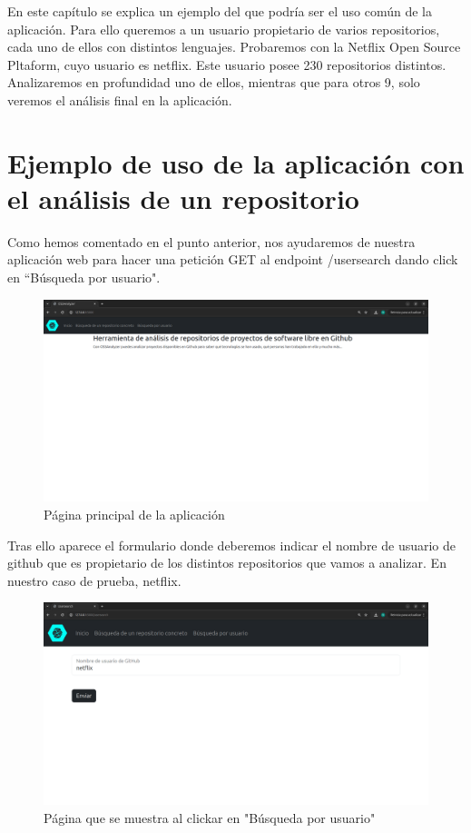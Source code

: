 \documentclass[a4paper, 12pt]{book}
\begin{document}
En este capítulo se explica un ejemplo del que podría ser el uso común de la aplicación. Para ello queremos a un usuario propietario de varios repositorios, cada uno de ellos con distintos lenguajes. Probaremos con la Netflix Open Source Pltaform, cuyo usuario es netflix. Este usuario posee 230 repositorios distintos. Analizaremos en profundidad uno de ellos, mientras que para otros 9, solo veremos el análisis final en la aplicación.

\section{Ejemplo de uso de la aplicación con el análisis de un repositorio}
\label{sec:Ejemplo de uso de la aplicación con el análisis de un repositorio}

Como hemos comentado en el punto anterior, nos ayudaremos de nuestra aplicación web para hacer una petición GET al endpoint /usersearch dando click en ``Búsqueda por usuario".

\begin{figure}[H]
  \centering
  \includegraphics[width=1\textwidth]{img/paginaprincipal.png}
  \caption{Página principal de la aplicación}
  \label{figura:mainpage2}
\end{figure}

Tras ello aparece el formulario donde deberemos indicar el nombre de usuario de github que es propietario de los distintos repositorios que vamos a analizar. En nuestro caso de prueba, netflix.

\begin{figure}[H]
  \centering
  \includegraphics[width=1\textwidth]{img/getusersearch.png}
  \caption{Página que se muestra al clickar en "Búsqueda por usuario"}
  \label{figura:getusersearch}
\end{figure}
\end{document}
